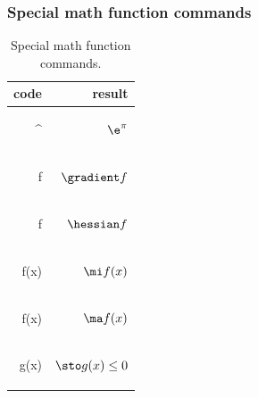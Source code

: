 \documentclass[report,english]{enacom}
\begin{document}
\subsubsection{Special math function commands} 
    \begin{table}[H]
		\begin{tabular}{rr}
            code & result \\ \hline
            \begin{lcode}
            \e^\pi\end{lcode} 
            & $\e^\pi$\\
            \begin{lcode}
            \gradient f\end{lcode} 
            & $\gradient f$\\
            \begin{lcode}
            \hessian f\end{lcode} 
            & $\hessian f$\\
             \begin{lcode}
            \mi f(x)\end{lcode} 
            & $\mi f(x)$\\
            \begin{lcode}
            \ma f(x)\end{lcode} 
            & $\ma f(x)$\\
            \begin{lcode}
            \sto g(x) \leq 0\end{lcode} 
            & $\sto g(x) \leq 0$\\
		\end{tabular} 
		\caption{Special math function commands.}
	\end{table}
    
\end{document}
